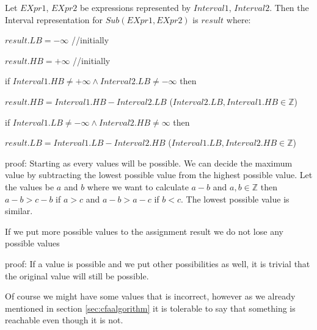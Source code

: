 \begin{theorem}
	Let $EXpr1$, $EXpr2$ be expressions represented by $Interval1$, $Interval2$. Then the Interval representation for $Sub(EXpr1, EXpr2)$ is $result$ where:
	
	$result.LB=-\infty$ //initially
	
	$result.HB=+\infty$ //initially
	
	if $Interval1.HB \neq +\infty \land Interval2.LB \neq -\infty$ then 
	
	$result.HB=Interval1.HB-Interval2.LB$ ($Interval2.LB, Interval1.HB \in \mathbb{Z}$)
	
	if $Interval1.LB \neq -\infty \land Interval2.HB \neq \infty$ then 
	
	$result.LB=Interval1.LB-Interval2.HB$ ($Interval1.LB, Interval2.HB \in \mathbb{Z}$)
	
\end{theorem}
{proof: } Starting as every values will be possible. We can decide the maximum value by subtracting the lowest possible value from the highest possible value. Let the values be $a$ and $b$ where we want to calculate $a-b$ and $a, b \in \mathbb{Z}$ then $a-b>c-b$ if $a>c$ and $a-b>a-c$ if $b<c$. The lowest possible value is similar.


\begin{theorem}
	If we put more possible values to the assignment result we do not lose any possible values	
\end{theorem}
{proof: }If a value is possible and we put other possibilities as well, it is trivial that the original value will still be possible.

 Of course we might have some values that is incorrect, however as we already mentioned in section \ref{sec:cfaalgorithm} it is tolerable to say that something is reachable even though it is not. 

